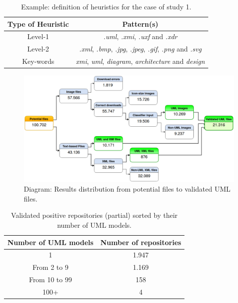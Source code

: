 \documentclass[a4paper, 12pt]{book}
\begin{document}
 \begin{table}[]
 \centering
 \caption{Example: definition of heuristics for the case of study 1.}
 \label{table:heuristics-cs1-example}
 \begin{tabular}{|c|c|}
 \hline
 \textbf{Type of Heuristic} & \textbf{Pattern(s)}                                                                                           \\ \hline
 Level-1                    & \textit{.uml}, \textit{.xmi}, \textit{.uxf} and \textit{.xdr}                                                 \\ \hline
 Level-2                    & \textit{.xml}, \textit{.bmp}, \textit{.jpg}, \textit{.jpeg}, \textit{.gif}, \textit{.png} and \textit{.svg}   \\ \hline
 Key-words                  & \textit{xmi}, \textit{uml}, \textit{diagram}, \textit{architecture} and \textit{design}                       \\ \hline
 \end{tabular}
 \end{table}
 \begin{figure}
   \centering
   \includegraphics[width=16cm, keepaspectratio]{img/file-results-models-diagram}
   \caption{Diagram: Results distribution from potential files to validated UML files.}
   \label{fig:validated-files-distribution}
 \end{figure}
 \begin{table}[]
   \centering
   \caption{Validated positive repositories (partial) sorted by their number of UML models.}
   \label{table:validated-repos-table}
   \begin{tabular}{|c|c|}
   \hline
   \textbf{Number of UML models} & \textbf{Number of repositories}     \\ \hline
   1                             & 1.947                               \\
   From 2 to 9                   & 1.169                               \\
   From 10 to 99                 & 158                                 \\
   100+                          & 4                                   \\ \hline
   \end{tabular}
 \end{table}
\end{document}
